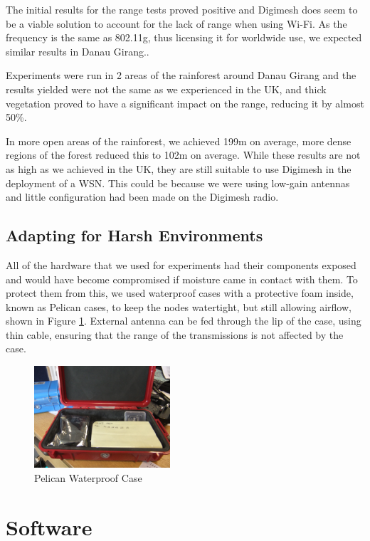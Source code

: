 The initial results for the range tests proved positive and Digimesh does seem to be a viable solution to account for the lack of range when using Wi-Fi. As the frequency is the same as 802.11g, thus licensing it for worldwide use, we expected similar results in Danau Girang..
						
Experiments were run in 2 areas of the rainforest around Danau Girang and the results yielded were not the same as we experienced in the UK, and thick vegetation proved to have a significant impact on the range, reducing it by almost 50\%.
			
In more open areas of the rainforest, we achieved 199m on average, more dense regions of the forest reduced this to 102m on average. While these results are not as high as we achieved in the UK, they are still suitable to use Digimesh in the deployment of a WSN. This could be because we were using low-gain antennas and little configuration had been made on the Digimesh radio.

\subsection{Adapting for Harsh Environments}
	All of the hardware that we used for experiments had their components exposed and would have become compromised if moisture came in contact with them. To protect them from this, we used waterproof cases with a protective foam inside, known as Pelican cases, to keep the nodes watertight, but still allowing airflow, shown in Figure \ref{tech:pelican}.
	External antenna can be fed through the lip of the case, using thin cable, ensuring that the range of the transmissions is not affected by the case. 

			\begin{figure}[!t]
			\centering
			\includegraphics[width=0.45\textwidth]{Chap3/figures/pelican}
			\caption{Pelican Waterproof Case}
			\label{tech:pelican}
			\end{figure}

\section{Software}
